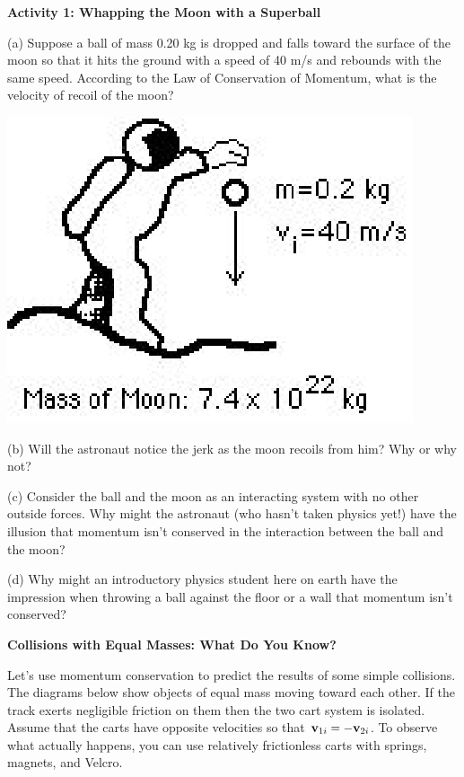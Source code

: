 \textbf{Activity 1: Whapping the Moon with a Superball} 

(a) Suppose a ball of mass 0.20 kg is dropped and falls toward the surface of
the moon so that it hits the ground with a speed of 40 m/s and rebounds with
the same speed. According to the Law of Conservation of Momentum, what is the
velocity of recoil of the moon?

\vspace{0.3cm}
{\par\raggedright \includegraphics{mom_cons_fig2.eps} \par}
\vspace{0.3cm}

(b) Will the astronaut notice the jerk as the moon recoils from him? Why or
why not?
\vspace{20mm}

(c) Consider the ball and the moon as an interacting system with no other outside
forces. Why might the astronaut (who hasn't taken physics yet!) have the illusion
that momentum isn't conserved in the interaction between the ball and the moon?
\vspace{20mm}

(d) Why might an introductory physics student here on earth have the impression
when throwing a ball against the floor or a wall that momentum isn't conserved?
\vspace{20mm}

\textbf{Collisions with Equal Masses: What Do You Know?} 

Let's use momentum conservation to predict the results of some simple collisions.
The diagrams below show objects of equal mass moving toward each other. If the
track exerts negligible friction on them then the two cart system is isolated.
Assume that the carts have opposite velocities so that \( {{\bf v}_{1i}} 
= - {{\bf v}_{2i}} \). To observe what actually happens, you can
use relatively frictionless carts with springs, magnets, and Velcro.

